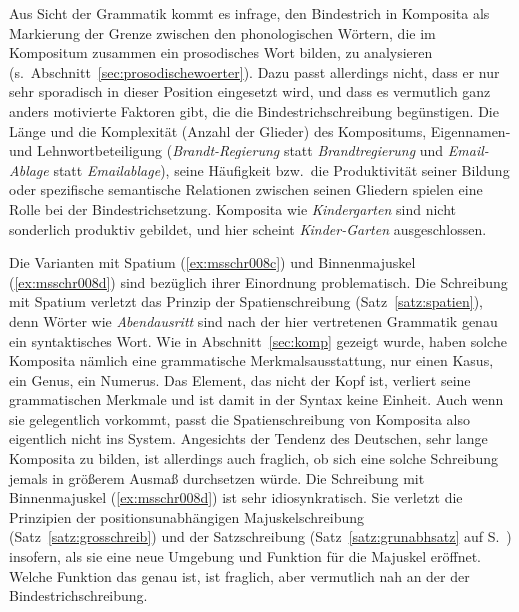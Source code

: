 
Aus Sicht der Grammatik kommt es infrage, den Bindestrich in Komposita als Markierung der Grenze zwischen den phonologischen Wörtern, die im Kompositum zusammen ein prosodisches Wort bilden, zu analysieren (s.\ Abschnitt~\ref{sec:prosodischewoerter}).
Dazu passt allerdings nicht, dass er nur sehr sporadisch in dieser Position eingesetzt wird, und dass es vermutlich ganz anders motivierte Faktoren gibt, die die Bindestrichschreibung begünstigen.
Die Länge und die Komplexität (Anzahl der Glieder) des Kompositums, Eigennamen- und Lehnwortbeteiligung (\textit{Brandt-Regierung} statt \textit{Brandtregierung} und \textit{Email-Ablage} statt \textit{Emailablage}), seine Häufigkeit bzw.\ die Produktivität seiner Bildung oder spezifische semantische Relationen zwischen seinen Gliedern spielen eine Rolle bei der Bindestrichsetzung.
Komposita wie \textit{Kindergarten} sind \zB nicht sonderlich produktiv gebildet, und hier scheint \textit{Kinder-Garten} ausgeschlossen.

Die Varianten mit Spatium (\ref{ex:msschr008c}) und Binnenmajuskel (\ref{ex:msschr008d}) sind bezüglich ihrer Einordnung problematisch.
Die Schreibung mit Spatium verletzt das Prinzip der Spatienschreibung (Satz~\ref{satz:spatien}), denn Wörter wie \textit{Abendausritt} sind nach der hier vertretenen Grammatik genau ein syntaktisches Wort.
Wie in Abschnitt~\ref{sec:komp} gezeigt wurde, haben solche Komposita nämlich eine grammatische Merkmalsausstattung, \zB nur einen Kasus, ein Genus, ein Numerus.
Das Element, das nicht der Kopf ist, verliert seine grammatischen Merkmale und ist damit in der Syntax keine Einheit.
Auch wenn sie gelegentlich vorkommt, passt die Spatienschreibung von Komposita also eigentlich nicht ins System.
Angesichts der Tendenz des Deutschen, sehr lange Komposita zu bilden, ist allerdings auch fraglich, ob sich eine solche Schreibung jemals in größerem Ausmaß durchsetzen würde.
Die Schreibung mit Binnenmajuskel (\ref{ex:msschr008d}) ist sehr idiosynkratisch.
Sie verletzt die Prinzipien der positionsunabhängigen Majuskelschreibung (Satz~\ref{satz:grosschreib}) und der Satzschreibung (Satz~\ref{satz:grunabhsatz} auf S.~\pageref{satz:grunabhsatz}) insofern, als sie eine neue Umgebung und Funktion für die Majuskel eröffnet.
Welche Funktion das genau ist, ist fraglich, aber vermutlich nah an der der Bindestrichschreibung.

